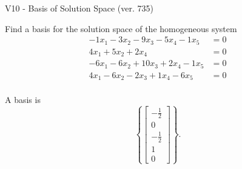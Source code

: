 \begin{exercise}
  \begin{exerciseTitle}V10 - Basis of Solution Space (ver. 735)\end{exerciseTitle}
  \begin{exerciseStatement}
    Find a basis for the solution space of the homogeneous system 
\begin{align*}
 -1 x_ 1 -3 x_ 2 -9 x_ 3 -5 x_ 4 -1 x_ 5 &= 0  \\ 
  4 x_ 1 + 5 x_ 2 + 2 x_ 4 &= 0  \\ 
  -6 x_ 1 -6 x_ 2 + 10 x_ 3 + 2 x_ 4 -1 x_ 5 &= 0  \\ 
  4 x_ 1 -6 x_ 2 -2 x_ 3 + 1 x_ 4 -6 x_ 5 &= 0  \\ 
 \end{align*}


 
  \end{exerciseStatement}

  \begin{exerciseAnswer}
   A basis is   
\[\left\{\left[\begin{array}{c}
-\frac{1}{2} \\
0 \\
-\frac{1}{2} \\
1 \\
0
\end{array}\right]\right\}.\]

  


  \end{exerciseAnswer}
\end{exercise}